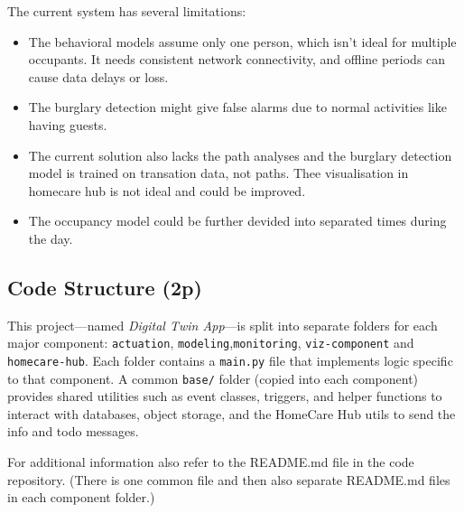 \documentclass[A4,10pt]{article}
\begin{document}
The current system has several limitations:
\begin{itemize}
    \item The behavioral models assume only one person, which isn't ideal for multiple occupants. It needs consistent network connectivity, and offline periods can cause data delays or loss.
    \item The burglary detection might give false alarms due to normal activities like having guests.
    \item The current solution also lacks the path analyses and the burglary detection model is trained on transation data, not paths. Thee visualisation in homecare hub is not ideal and could be improved.
    \item The occupancy model could be further devided into separated times during the day.
\end{itemize}
\subsection{Code Structure (2p)}
\label{sec:code_structure}

This project---named \textit{Digital Twin App}---is split into separate folders for each major component: 
\texttt{actuation}, \texttt{modeling},\texttt{monitoring}, \texttt{viz-component} and \texttt{homecare-hub}. Each folder contains a \texttt{main.py} file
that implements logic specific to that component.
A common \texttt{base/} folder (copied into each component) provides shared utilities 
such as event classes, triggers, and helper functions to interact with databases, object storage, 
and the HomeCare Hub utils to send the info and todo messages.

For additional information also refer to the README.md file in the code repository. (There is one common file and then also separate README.md files in each component folder.)
\end{document}
